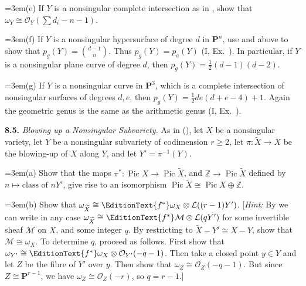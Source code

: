 {\noindent\hangindent=3em\hspace*{1.7em}\hypertarget{ex-II-8.4-e}{}(e) If $Y$ is a nonsingular complete intersection as in , show that $\omega_Y\cong\mathcal O_Y(\sum d_i-n-1)$.

\noindent\hangindent=3em\hspace*{1.7em}\hypertarget{ex-II-8.4f}{}(f) If $Y$ is a nonsingular hypersurface of degree $d$ in $\mathbf P^n$\EditionText{}, use  and  above to show that $p_g(Y)=\binom{d-1}{n}$. Thus $p_g(Y)=p_a(Y)$ (I, Ex.~). In particular, if $Y$ is a nonsingular plane curve of degree $d$, then $p_g(Y)=\frac12(d-1)(d-2)$.

\noindent\hangindent=3em\hspace*{1.7em}(g) If $Y$ is a nonsingular curve in $\mathbf P^3$, which is a complete intersection of nonsingular surfaces of degrees $d,e$, then $p_g(Y)=\frac12de(d+e-4)+1$. Again the geometric genus is the same as the arithmetic genus (I, Ex.~).

\smallskip
\noindent\hypertarget{ex-II-8.5}{}\textbf{8.5.} \emph{Blowing up a Nonsingular Subvariety.} As in (), let $X$ be a nonsingular variety, let $Y$ be a nonsingular subvariety of codimension $r\ge2$, let $\pi\colon\widetilde X\to X$ be the blowing-up of $X$ along $Y$, and let $Y'=\pi^{-1}(Y)$.

\noindent\hangindent=3em\hspace*{1.7em}\hypertarget{ex-II-8.5-a}{}(a) Show that the maps $\pi^*\colon\operatorname{Pic} X\to\operatorname{Pic}\widetilde X$, and $\mathbb Z\to\operatorname{Pic}\widetilde X$ defined by $n\mapsto\text{class of }nY'$, give rise to an isomorphism $\operatorname{Pic}\widetilde X\cong\operatorname{Pic} X\oplus\mathbb Z$.

\noindent\hangindent=3em\hspace*{1.7em}(b) Show that $\omega_{\widetilde X}\cong\EditionText{f^*}\omega_X\otimes\mathcal L((r-1)Y')$. [\emph{Hint:} By  we can write in any case $\omega_{\widetilde X}\cong\EditionText{f^*}\mathcal M\otimes\mathcal L(qY')$ for some invertible sheaf $\mathcal M$ on $X$, and some integer $q$. By restricting to $\widetilde X-Y'\cong X-Y$, show that $\mathcal M\cong\omega_X$. To determine $q$, proceed as follows. First show that $\omega_{Y'}\cong\EditionText{f^*}\omega_X\otimes\mathcal O_{Y'}(-q-1)$. Then take a closed point $y\in Y$ and let $Z$ be the fibre of $Y'$ over $y$. Then show that $\omega_Z\cong\mathcal O_Z(-q-1)$. But since $Z\cong\mathbf P^{r-1}$, we have $\omega_Z\cong\mathcal O_Z(-r)$, so $q=r-1$.]

}
